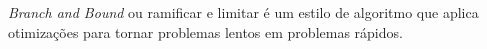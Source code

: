 \emph{Branch and Bound} ou ramificar e limitar é um estilo de algoritmo
que aplica otimizações para tornar problemas lentos em problemas rápidos.
